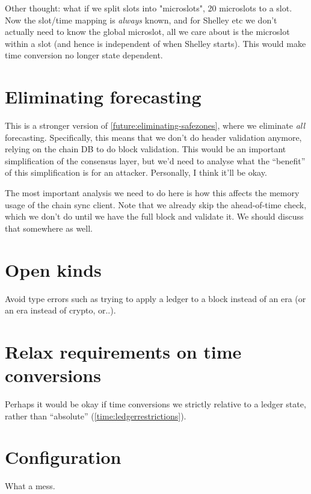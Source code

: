 Other thought: what if we split slots into "microslots", 20 microslots to a
slot. Now the slot/time mapping is \emph{always} known, and for Shelley etc
we don't actually need to know the global microslot, all we care about is
the microslot within a slot (and hence is independent of when Shelley starts).
This would make time conversion no longer state dependent.

\section{Eliminating forecasting}
\label{future:eliminating-forecasting}

This is a stronger version of \cref{future:eliminating-safezones}, where
we eliminate \emph{all} forecasting. Specifically, this means that we don't
do header validation anymore, relying on the chain DB to do block validation.
This would be an important simplification of the consensus layer, but we'd
need to analyse what the ``benefit'' of this simplification is for an
attacker. Personally, I think it'll be okay.

The most important analysis we need to do here is how this affects the memory
usage of the chain sync client. Note that we already skip the ahead-of-time
check, which we don't do until we have the full block and validate it. We
should discuss that somewhere as well.

\section{Open kinds}
\label{future:openkinds}

Avoid type errors such as trying to apply a ledger to a block instead of an era
(or an era instead of crypto, or..).

\section{Relax requirements on time conversions}
\label{future:relax-time-requirements}

Perhaps it would be okay if time conversions we strictly relative to a ledger
state, rather than ``absolute'' (\cref{time:ledgerrestrictions}).

\section{Configuration}

What a mess.


